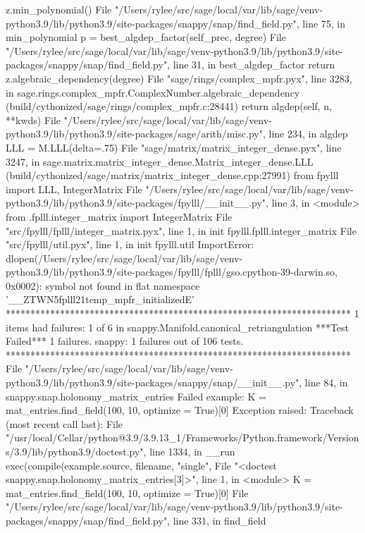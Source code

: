         z.min_polynomial()
      File "/Users/rylee/src/sage/local/var/lib/sage/venv-python3.9/lib/python3.9/site-packages/snappy/snap/find_field.py", line 75, in min_polynomial
        p = best_algdep_factor(self_prec, degree)
      File "/Users/rylee/src/sage/local/var/lib/sage/venv-python3.9/lib/python3.9/site-packages/snappy/snap/find_field.py", line 31, in best_algdep_factor
        return z.algebraic_dependency(degree)
      File "sage/rings/complex_mpfr.pyx", line 3283, in sage.rings.complex_mpfr.ComplexNumber.algebraic_dependency (build/cythonized/sage/rings/complex_mpfr.c:28441)
        return algdep(self, n, **kwds)
      File "/Users/rylee/src/sage/local/var/lib/sage/venv-python3.9/lib/python3.9/site-packages/sage/arith/misc.py", line 234, in algdep
        LLL = M.LLL(delta=.75)
      File "sage/matrix/matrix_integer_dense.pyx", line 3247, in sage.matrix.matrix_integer_dense.Matrix_integer_dense.LLL (build/cythonized/sage/matrix/matrix_integer_dense.cpp:27991)
        from fpylll import LLL, IntegerMatrix
      File "/Users/rylee/src/sage/local/var/lib/sage/venv-python3.9/lib/python3.9/site-packages/fpylll/__init__.py", line 3, in <module>
        from .fplll.integer_matrix import IntegerMatrix
      File "src/fpylll/fplll/integer_matrix.pyx", line 1, in init fpylll.fplll.integer_matrix
      File "src/fpylll/util.pyx", line 1, in init fpylll.util
    ImportError: dlopen(/Users/rylee/src/sage/local/var/lib/sage/venv-python3.9/lib/python3.9/site-packages/fpylll/fplll/gso.cpython-39-darwin.so, 0x0002): symbol not found in flat namespace '__ZTWN5fplll21temp_mpfr_initializedE'
**********************************************************************
1 items had failures:
   1 of   6 in snappy.Manifold.canonical_retriangulation
***Test Failed*** 1 failures.
snappy:
   1 failures out of 106 tests.
**********************************************************************
File "/Users/rylee/src/sage/local/var/lib/sage/venv-python3.9/lib/python3.9/site-packages/snappy/snap/__init__.py", line 84, in snappy.snap.holonomy_matrix_entries
Failed example:
    K = mat_entries.find_field(100, 10, optimize = True)[0]
Exception raised:
    Traceback (most recent call last):
      File "/usr/local/Cellar/python@3.9/3.9.13_1/Frameworks/Python.framework/Versions/3.9/lib/python3.9/doctest.py", line 1334, in __run
        exec(compile(example.source, filename, "single",
      File "<doctest snappy.snap.holonomy_matrix_entries[3]>", line 1, in <module>
        K = mat_entries.find_field(100, 10, optimize = True)[0]
      File "/Users/rylee/src/sage/local/var/lib/sage/venv-python3.9/lib/python3.9/site-packages/snappy/snap/find_field.py", line 331, in find_field
